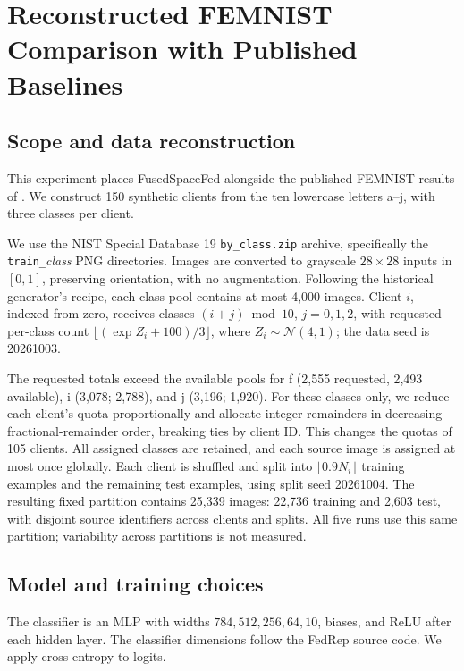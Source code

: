 \section{\texorpdfstring{\coauthordiffcolor Reconstructed FEMNIST Comparison with Published Baselines}{Reconstructed FEMNIST Comparison with Published Baselines}}
\label{app:fedrep_comparison}

\subsection{Scope and data reconstruction}

This experiment places FusedSpaceFed alongside the published FEMNIST
results of \citet{collins2021fedrep}. We construct 150 synthetic clients
from the ten lowercase letters a--j, with three classes per client.

We use the NIST Special Database 19 \texttt{by\_class.zip} archive,
specifically the \texttt{train\_}\textit{class} PNG directories.
Images are converted to grayscale $28\times28$ inputs in $[0,1]$, preserving
orientation, with no augmentation. Following the historical generator's
recipe, each class pool contains at most 4,000 images. Client $i$, indexed
from zero, receives classes $(i+j)\bmod10$, $j=0,1,2$, with requested
per-class count $\lfloor(\exp Z_i+100)/3\rfloor$, where
$Z_i\sim\mathcal{N}(4,1)$; the data seed is 20261003.

The requested totals exceed the available pools for f (2,555 requested,
2,493 available), i (3,078; 2,788), and j (3,196; 1,920). For these classes
only, we reduce each client's quota proportionally and allocate integer
remainders in decreasing fractional-remainder order, breaking ties by
client ID. This changes the quotas of 105 clients. All assigned classes
are retained, and each source image is assigned at most once globally.
Each client is shuffled and split into $\lfloor0.9N_i\rfloor$ training
examples and the remaining test examples, using split seed 20261004.
The resulting fixed partition contains 25,339 images: 22,736 training and
2,603 test, with disjoint source identifiers across clients and splits.
All five runs use this same partition; variability across partitions is
not measured.

\subsection{Model and training choices}

The classifier is an MLP with widths $784,512,256,64,10$, biases, and ReLU
after each hidden layer. The classifier dimensions follow the FedRep
source code. We apply cross-entropy to logits.

